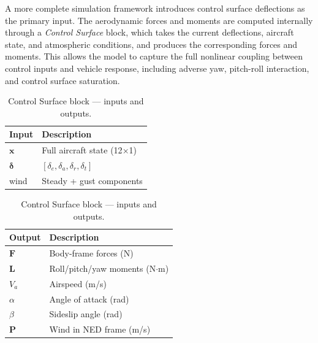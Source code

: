 \documentclass[12pt,a4paper]{article}
\begin{document}
A more complete simulation framework introduces control surface deflections as the primary input. The aerodynamic forces and moments are computed internally through a \textit{Control Surface} block, which takes the current deflections, aircraft state, and atmospheric conditions, and produces the corresponding forces and moments. This allows the model to capture the full nonlinear coupling between control inputs and vehicle response, including adverse yaw, pitch-roll interaction, and control surface saturation.

\begin{table}[h!]
    \centering
    \caption{Control Surface block --- inputs and outputs.}
    \label{tab:cs_io}
    \begin{minipage}{0.48\textwidth}
        \centering
        \begin{tabular}{ll}
            \toprule
            \textbf{Input} & \textbf{Description} \\
            \midrule
            $\mathbf{x}$          & Full aircraft state (12$\times$1) \\
            $\boldsymbol{\delta}$ & $[\delta_e, \delta_a, \delta_r, \delta_t]$ \\
            wind                  & Steady + gust components \\
            \bottomrule
        \end{tabular}
    \end{minipage}
    \hfill
    \begin{minipage}{0.48\textwidth}
        \centering
        \begin{tabular}{ll}
            \toprule
            \textbf{Output} & \textbf{Description} \\
            \midrule
            $\mathbf{F}$ & Body-frame forces (N) \\
            $\mathbf{L}$ & Roll/pitch/yaw moments (N$\cdot$m) \\
            $V_a$        & Airspeed (m/s) \\
            $\alpha$     & Angle of attack (rad) \\
            $\beta$      & Sideslip angle (rad) \\
            $\mathbf{P}$ & Wind in NED frame (m/s) \\
            \bottomrule
        \end{tabular}
    \end{minipage}
\end{table}
\end{document}
